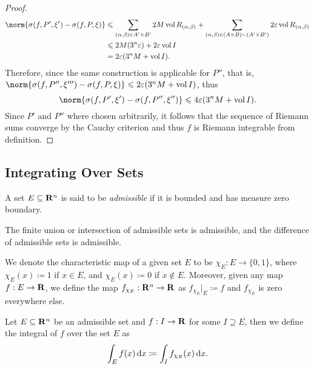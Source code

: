 \begin{proof}
\begin{align*}
  \norm{\sigma(f, P', \xi') - \sigma(f, P, \xi)}
  &\leq  \sum_{(\alpha, \beta) \in A' \times B'} 2 M \Vol R_{(\alpha, \beta)}
    + \sum_{(\alpha, \beta) \in (A \times B) \setminus (A' \times B')}
    2 \varepsilon \Vol R_{(\alpha, \beta)} \\
  &\leq 2 M (3^n \varepsilon) + 2 \varepsilon \Vol I \\
  &= 2 \varepsilon(3^n M + \Vol I).
\end{align*}
Therefore, since the same construction is applicable for \(P''\), that is,
\(\norm{\sigma(f, P'', \xi''') - \sigma(f, P, \xi)} \leq 2 \varepsilon (3^n M +
\Vol I)\), thus
\[
  \norm{\sigma(f, P', \xi') - \sigma(f, P'', \xi'')}
  \leq 4 \varepsilon (3^n M + \Vol I).
\]
Since \(P'\) and \(P''\) where chosen arbitrarily, it follows that the sequence
of Riemann sums converge by the Cauchy criterion and thus \(f\) is Riemann
integrable from definition.
\end{proof}

\subsection{Integrating Over Sets}

\begin{definition}
\label{def:admissible-set}
A set \(E \subseteq \mathbf{R}^n\) is said to be \emph{admissible} if it is bounded and
has measure zero boundary.
\end{definition}

\begin{corollary}
\label{cor:operations-admissible-sets}
The finite union or intersection of admissible sets is admissible, and the
difference of admissible sets is admissible.
\end{corollary}

\begin{notation}
\label{not:characteristic-set}
We denote the characteristic map of a given set \(E\) to be \(\chi_E: E \to \{0,
1\}\), where \(\chi_E(x) \coloneq 1\) if \(x \in E\), and \(\chi_E(x) \coloneq
0\) if \(x \not\in E\). Moreover, given any map \(f: E \to \mathbf{R}\), we define the
map \(f_{\chi_E}: \mathbf{R}^n \to \mathbf{R}\) as \(f_{\chi_{E}}|_{E} \coloneq f\) and
\(f_{\chi_{E}}\) is zero everywhere else.
\end{notation}

\begin{definition}
\label{def:riemann-integral-over-set}
Let \(E \subseteq \mathbf{R}^n\) be an admissible set and \(f: I \to \mathbf{R}\) for some \(I
\supseteq E\), then we define the integral of \(f\) over the set \(E\) as
\[
  \int_E f(x)\, \mathrm{d} x \coloneq \int_I f_{\chi_E}(x)\, \mathrm{d} x.
\]
\end{definition}

